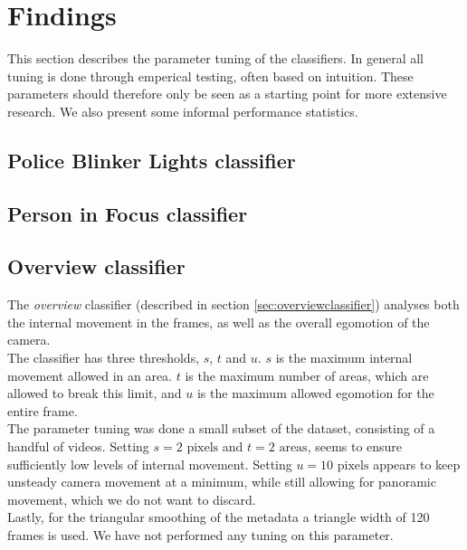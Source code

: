 \section{Findings}
%
This section describes the parameter tuning of the classifiers. In general all tuning is done through emperical testing, often based on intuition. These parameters should therefore only be seen as a starting point for more extensive research. We also present some informal performance statistics.
%
\subsection{Police Blinker Lights classifier}
\subsection{Person in Focus classifier}
\subsection{Overview classifier}
%
The \textit{overview} classifier (described in section \ref{sec:overviewclassifier}) analyses both the internal movement in the frames, as well as the overall egomotion of the camera.\\
The classifier has three thresholds, $s$, $t$ and $u$. $s$ is the maximum internal movement allowed in an area. $t$ is the maximum number of areas, which are allowed to break this limit, and $u$ is the maximum allowed egomotion for the entire frame.\\
The parameter tuning was done a small subset of the dataset, consisting of a handful of videos. Setting $s = 2 \text{ pixels}$ and $t = 2 \text{ areas}$, seems to ensure sufficiently low levels of internal movement. Setting $u = 10 \text{ pixels}$ appears to keep unsteady camera movement at a minimum, while still allowing for panoramic movement, which we do not want to discard.\\
Lastly, for the triangular smoothing of the metadata a triangle width of 120 frames is used. We have not performed any tuning on this parameter.
%
